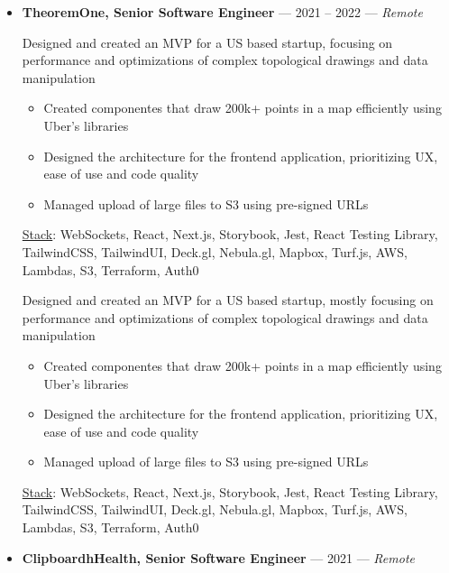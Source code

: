 \documentclass{resume}
\begin{document}
\begin{itemize}[leftmargin=*,itemsep=1ex]
  \item 
    \textbf{TheoremOne, Senior Software Engineer} --- 2021 -- 2022 --- \textit{Remote}
    \par
    Designed and created an MVP for a US based startup, focusing on performance and optimizations of complex topological drawings and data manipulation
    \begin{itemize}
      \item Created componentes that draw 200k+ points in a map efficiently using Uber’s libraries
      \item Designed the architecture for the frontend application, prioritizing UX, ease of use and code quality
      \item Managed upload of large files to S3 using pre-signed URLs
    \end{itemize}
    \underline{Stack}: WebSockets, React, Next.js, Storybook, Jest, React Testing Library, TailwindCSS, TailwindUI, Deck.gl, Nebula.gl, Mapbox, Turf.js, AWS, Lambdas, S3, Terraform, Auth0
    \par \vspace{0.2cm}
    Designed and created an MVP for a US based startup, mostly focusing on performance and optimizations of complex topological drawings and data manipulation
    \begin{itemize}
      \item Created componentes that draw 200k+ points in a map efficiently using Uber’s libraries
      \item Designed the architecture for the frontend application, prioritizing UX, ease of use and code quality
      \item Managed upload of large files to S3 using pre-signed URLs
    \end{itemize}
    \underline{Stack}: WebSockets, React, Next.js, Storybook, Jest, React Testing Library, TailwindCSS, TailwindUI, Deck.gl, Nebula.gl, Mapbox, Turf.js, AWS, Lambdas, S3, Terraform, Auth0
  \item 
    \textbf{ClipboardhHealth, Senior Software Engineer} --- 2021 --- \textit{Remote}
    \par 


\end{itemize}
\end{document}
